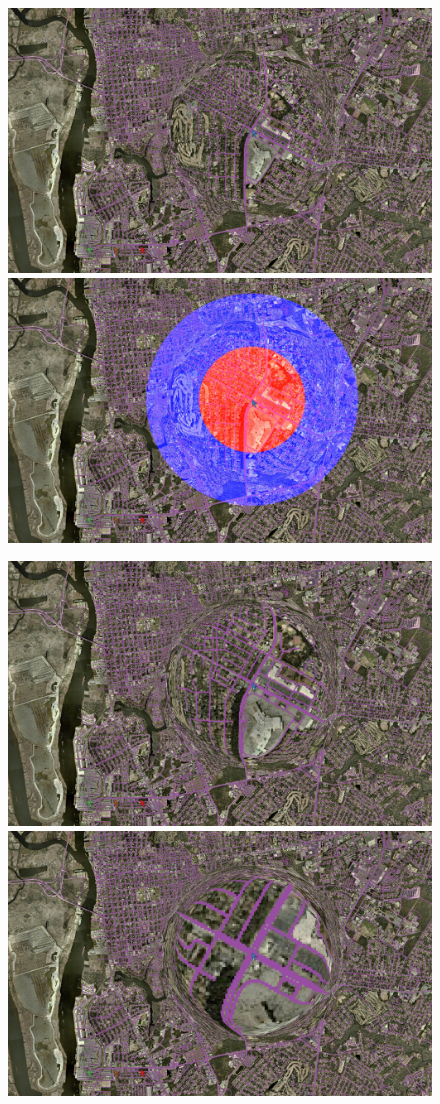 \begin{figure}[htp] \centering
    \includegraphics[width=0.49\linewidth]{img/s_r_5_zoom.jpg}
    \includegraphics[width=0.49\linewidth]{img/s_r_5_zoom_color.jpg}
    \vspace{3 mm}

    \includegraphics[width=0.49\linewidth]{img/s_r_10_zoom.jpg}
    \includegraphics[width=0.49\linewidth]{img/s_r_20_zoom.jpg}
    \vspace{3 mm}


\end{figure}
